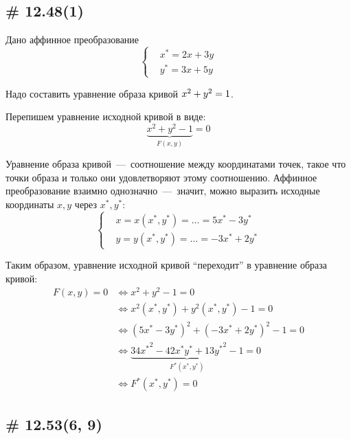 \documentclass[a4paper,12pt]{article}
\begin{document}
  
  \subsection{\# 12.48(1)}
  
  Дано аффинное преобразование
  \[
    \left\{
      \begin{aligned}
        &x^* = 2x + 3y\\
        &y^* = 3x + 5y
      \end{aligned}
    \right.
  \]
  
  Надо составить уравнение образа кривой $x^2 \hm+ y^2 \hm= 1$.
  
  \begin{solution}
    Перепишем уравнение исходной кривой в виде:
    \[
      \underbrace{x^2 + y^2 - 1}_{F(x, y)} = 0
    \]
    
    Уравнение образа кривой~---~соотношение между координатами точек, такое что точки образа и только они удовлетворяют этому соотношению.
    Аффинное преобразование взаимно однозначно~---~значит, можно выразить исходные координаты $x, y$ через $x^*, y^*$:
    \[
      \left\{
        \begin{aligned}
          &x = x(x^*, y^*) = \ldots = 5x^* - 3y^*\\
          &y = y(x^*, y^*) = \ldots = -3x^* + 2y^*
        \end{aligned}
      \right.
    \]
    
    Таким образом, уравнение исходной кривой ``переходит'' в уравнение образа кривой:
    \begin{equation*}
    \begin{split}
      F(x, y) = 0 &\Leftrightarrow x^2 + y^2 - 1 = 0\\
                  &\Leftrightarrow x^2(x^*, y^*) + y^2(x^*, y^*) - 1 = 0\\
                  &\Leftrightarrow (5x^* - 3y^*)^2 + (-3x^* + 2y^*)^2 - 1 = 0\\
                  &\Leftrightarrow \underbrace{{34x^*}^2 - 42x^*y^* + {13y^*}^2 - 1}_{F^*(x^*, y^*)} = 0\\
                  &\Leftrightarrow F^*(x^*, y^*) = 0
    \end{split}
    \end{equation*}
  \end{solution}
  
  
  \subsection{\# 12.53(6, 9)}
  
\end{document}
